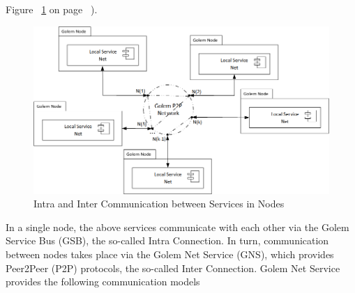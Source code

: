 
Figure ~\ref{fig:CCR} on page ~\pageref{fig:CCR}).

\begin{figure}[H]
    \centering
    \includegraphics[width=14cm,angle=0]{./diag/Reference/CommunicationConcept-Reference.png}
	\caption{Intra and Inter Communication between Services in Nodes}
    \label{fig:CCR}
\end{figure}


In a single node, the above services communicate with each other via the Golem Service Bus (GSB), the so-called Intra Connection.
In turn, communication between nodes takes place via the Golem Net Service (GNS), which provides Peer2Peer (P2P) protocols, the so-called Inter Connection.
Golem Net Service provides the following communication models

